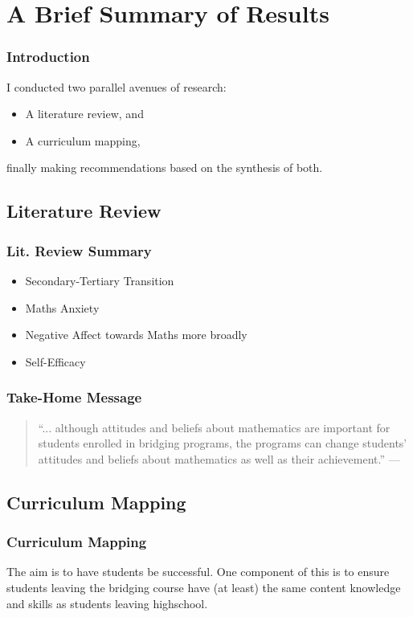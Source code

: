 \documentclass[14pt]{beamer}
\begin{document}
\section{A Brief Summary of Results}

\begin{frame}
\frametitle{Introduction}
I conducted two parallel avenues of research:
\begin{itemize}
	\item A literature review, and
	\item A curriculum mapping,
\end{itemize}
finally making recommendations based on the synthesis of both.
\end{frame}

\subsection{Literature Review}

\begin{frame}
\frametitle{Lit. Review Summary}
\begin{itemize}
	\item Secondary-Tertiary Transition {\footnotesize \cite{Clark2008}}
	\item Maths Anxiety {\footnotesize \cite{Ramirez2018}}
	\item Negative Affect towards Maths more broadly {\footnotesize\cite{King2015}}
	\item Self-Efficacy {\footnotesize \cite{Klinger2011}}
\end{itemize}
\end{frame}

\begin{frame}
\frametitle{Take-Home Message}
\begin{quote}
``... although attitudes and beliefs about mathematics are important for students
enrolled in bridging programs, the programs can change students' attitudes and
beliefs about mathematics as well as their achievement.'' \flushright ---
\end{quote}
\end{frame}

\subsection{Curriculum Mapping}

\begin{frame}
\frametitle{Curriculum Mapping}
The aim is to have students be successful. One component of this is to ensure students leaving the bridging course have (at least) the same content knowledge and skills as students leaving highschool. 
\end{frame}
\end{document}
